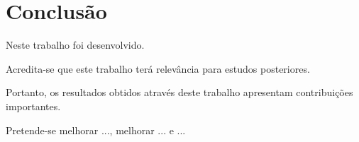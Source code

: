 \chapter{Conclusão}

Neste trabalho foi desenvolvido.

Acredita-se que este trabalho terá relevância para estudos posteriores.

Portanto, os resultados obtidos através deste trabalho apresentam
contribuições importantes.



Pretende-se melhorar ..., melhorar ... e ...